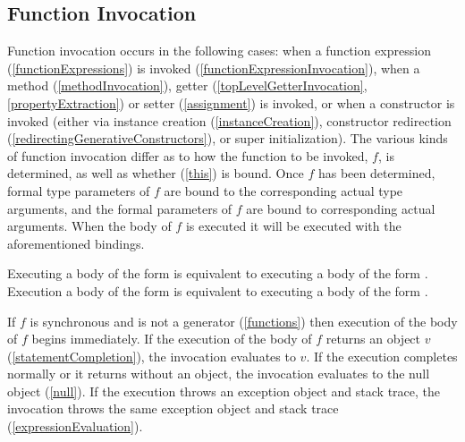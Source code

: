 \documentclass[makeidx]{article}
\begin{document}
{\subsection{Function Invocation}

\LMHash{}%
Function invocation occurs in the following cases:
when a function expression (\ref{functionExpressions})
is invoked (\ref{functionExpressionInvocation}),
when a method (\ref{methodInvocation}),
getter (\ref{topLevelGetterInvocation}, \ref{propertyExtraction})
or setter (\ref{assignment})
is invoked,
or when a constructor is invoked
(either via instance creation (\ref{instanceCreation}),
constructor redirection (\ref{redirectingGenerativeConstructors}),
or super initialization).
The various kinds of function invocation differ as to
how the function to be invoked, $f$, is determined,
as well as whether \THIS{} (\ref{this}) is bound.
Once $f$ has been determined,
formal type parameters of $f$ are bound to
the corresponding actual type arguments,
and the formal parameters of $f$ are bound to corresponding actual arguments.
When the body of $f$ is executed it will be executed
with the aforementioned bindings.

\LMHash{}%
Executing a body of the form  is equivalent to executing
a body of the form .
Execution a body of the form  is equivalent to executing
a body of the form .

\LMHash{}%
If $f$ is synchronous and is not a generator (\ref{functions}) then
execution of the body of $f$ begins immediately.
If the execution of the body of $f$ returns an object $v$
(\ref{statementCompletion}),
the invocation evaluates to $v$.
If the execution completes normally or it returns without an object,
the invocation evaluates to the null object (\ref{null}).
If the execution throws an exception object and stack trace,
the invocation throws the same exception object and stack trace
(\ref{expressionEvaluation}).


}
\end{document}
